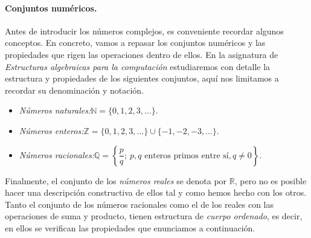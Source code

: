 \paragraph{Conjuntos numéricos.} 
Antes de introducir los números complejos, es conveniente recordar algunos conceptos.
En concreto, vamos a repasar los conjuntos numéricos y las propiedades que rigen las operaciones dentro de ellos.
En la asignatura de \emph{Estructuras algebraicas para la computación} estudiaremos con detalle la estructura y propiedades de los siguientes conjuntos, aquí nos limitamos a recordar su denominación y notación.

\begin{itemize}
\item
\emph{Números naturales:}\quad $\mathbb{N} =\{ 0,1, 2, 3,\dots\}$.
\item
\emph{Números enteros:}\quad $\mathbb{Z} =\{ 0, 1, 2,  3,\dots\} \cup \{ -1, -2, -3,\dots\}$.
\item
\emph{Números racionales:}\quad $\mathbb{Q}=\left\{ \dfrac{p}{q};\ p, q \text{ enteros primos entre sí}, q\ne 0\right\}$.
\end{itemize}

Finalmente, el conjunto de los \emph{números reales} se denota por $\mathbb{R}$, pero no es posible hacer una descripción constructiva de ellos tal y como hemos hecho con los otros.
Tanto el conjunto de los números racionales como el de los reales con las operaciones de suma y producto, tienen estructura de \emph{cuerpo ordenado}, es decir, en ellos se verifican las propiedades que enunciamos a continuación.

